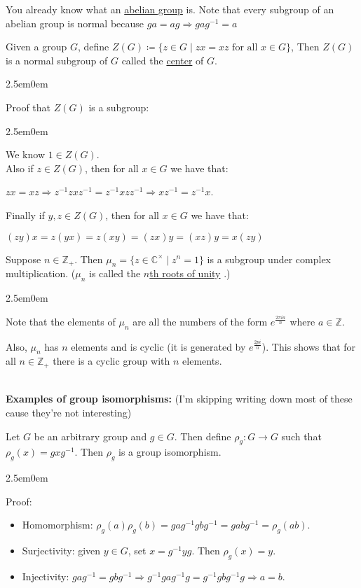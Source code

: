 \documentclass{book}
\newcommand{\hTwo}{%
\color{MidnightBlue}%
   \fontsize{13}{15}\selectfont%
}
\newcommand{\hThree}{%
   \color{PineGreen!85!Orange}
   \fontsize{12}{14}\selectfont%
}
\newcommand{\exOne}{%
   \color{Purple}%
   \fontsize{13}{15}\selectfont%
}
\newcommand{\exTwoP}{%
   \color{RedViolet}%
   \fontsize{13}{15}\selectfont%
}
\newenvironment{myIndent}{%
   \begin{adjustwidth}{2.5em}{0em}%
}{%
   \end{adjustwidth}%
}
\newcommand{\udefine}[1]{{%
   \setulcolor{Red}%
   \setul{0.14em}{0.07em}%
   \ul{#1}%
}}
\newcommand{\blab}[1]{\textbf{#1}}
\newcommand{\mySepTwo}[1][.]{%
   {\noindent\color{#1}{\rule{6.5in}{0.5mm}}}\\%
}
\newcommand{\retTwo}{\hfill\bigbreak}
\begin{document}
You already know what an \udefine{abelian group} is. Note that every subgroup of an abelian group is normal because $ga = ag \Longrightarrow gag^{-1} = a$\retTwo

Given a group $G$, define $Z(G) \coloneq \{z \in G \mid zx = xz \text{ for all } x \in G\}$, Then $Z(G)$ is a normal subgroup of $G$ called the \udefine{center} of $G$.

\begin{myIndent}\hTwo
	Proof that $Z(G)$ is a subgroup:
	\begin{myIndent}\hThree
		We know $1 \in Z(G)$.\\ 
		Also if $z \in Z(G)$, then for all $x \in G$ we have that:
		
		{\centering $zx = xz \Rightarrow z^{-1}zxz^{-1} = z^{-1}xzz^{-1} \Rightarrow xz^{-1} = z^{-1}x$.\retTwo\par}
	
		Finally if $y, z \in Z(G)$, then for all $x \in G$ we have that:
	
		{\centering $(zy)x = z(yx) = z(xy) = (zx)y = (xz)y = x(zy)$ \retTwo\par}
	\end{myIndent}
\end{myIndent}

Suppose $n \in \mathbb{Z}_+$. Then $\mu_n = \{z \in \mathbb{C}^\times \mid z^n = 1\}$ is a subgroup under complex\\ multiplication. ($\mu_n$ is called the \udefine{$n$th roots of unity}.)

\begin{myIndent}\hTwo
	Note that the elements of $\mu_n$ are all the numbers of the form $e^{\frac{2\pi ia }{n}}$ where $a \in \mathbb{Z}$.\retTwo

	Also, $\mu_n$ has $n$ elements and is cyclic (it is generated by $e^{\frac{2pi}{n}}$). This shows that for all $n \in \mathbb{Z}_+$ there is a cyclic group with $n$ elements.\retTwo
\end{myIndent}

\exOne

\mySepTwo

\blab{Examples of group isomorphisms:} (I'm skipping writing down most of these cause they're not interesting)\retTwo

Let $G$ be an arbitrary group and $g \in G$. Then define $\rho_g: G \longrightarrow G$ such that\\ $\rho_g(x) = gxg^{-1}$. Then $\rho_g$ is a group isomorphism.

\begin{myIndent}\exTwoP
	Proof:\\ [-20pt]
	\begin{itemize}
		\item Homomorphism: $\rho_g(a)\rho_g(b) = gag^{-1}gbg^{-1} = gabg^{-1} = \rho_g(ab)$.
		\item Surjectivity: given $y \in G$, set $x = g^{-1}yg$. Then $\rho_g(x) = y$.
		\item Injectivity: $gag^{-1} = gbg^{-1} \Rightarrow g^{-1}gag^{-1}g = g^{-1}gbg^{-1}g \Rightarrow a = b$.\newpage
	\end{itemize}
\end{myIndent}
\end{document}

